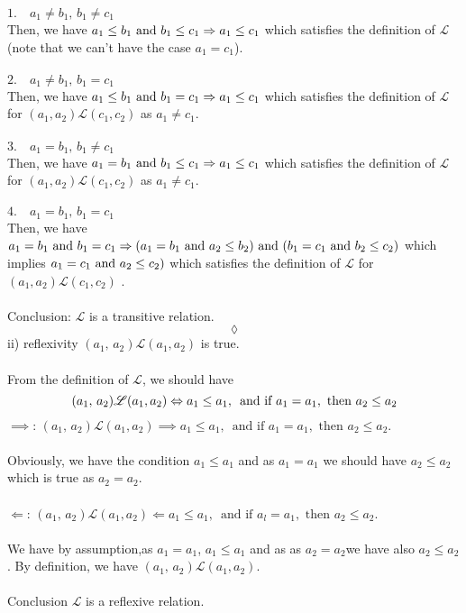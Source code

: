  $1.\quad a_1\neq b_1,\, b_1\neq c_1$\\
 Then, we have $a_1\leq b_1 \text{ and } b_1\leq c_1\Rightarrow a_1\leq c_1 $ which satisfies the definition of $\mathscr{L}$ (note that we can't have the case $a_1=c_1$).\\\\
  $2.\quad a_1\neq b_1,\, b_1= c_1$\\
  Then, we have $a_1\leq b_1 \text{ and } b_1 = c_1\Rightarrow a_1\leq c_1  $ which satisfies the definition of $\mathscr{L}$ for  $(a_1,a_2)\mathscr{L}(c_1, c_2)$ as $a_1\neq c_1$.\\\\
    $3.\quad a_1= b_1,\, b_1\neq c_1$\\
  Then, we have $a_1= b_1 \text{ and } b_1 \leq c_1\Rightarrow a_1\leq c_1  $ which satisfies the definition of $\mathscr{L}$ for  $(a_1,a_2)\mathscr{L}(c_1, c_2)$ as $a_1\neq c_1$.\\\\
      $4.\quad a_1= b_1,\, b_1=c_1$\\
  Then, we have $a_1= b_1 \text{ and } b_1 = c_1\Rightarrow (a_1= b_1 \text{ and } a_2\leq b_2) \text{ and }  (b_1= c_1 \text{ and } b_2\leq c_2) $ which implies  $a_1= c_1 \text{ and } a_2\leq c_2) $ which satisfies the definition of $\mathscr{L}$ for  $(a_1,a_2)\mathscr{L}(c_1, c_2)$ .\\\\
  Conclusion: $\mathscr{L}$ is a transitive relation.
$$\lozenge$$
ii) reflexivity  $(a_1,\, a_2)\mathscr{L} (a_1, a_2)$ is true.\\\\
 From the definition of $\mathscr{L}$, we should have  $$(a_1,\, a_2)\mathscr{L} (a_1, a_2)\Leftrightarrow a_1\leq a_1,\,\text{ and if } a_1 = a_1, \text{ then } a_2\leq a_2$$
 $\implies $: $(a_1,\, a_2)\mathscr{L} (a_1, a_2)\implies a_1\leq a_1,\,\text{ and if } a_1 = a_1, \text{ then } a_2\leq a_2$.\\\\
 Obviously, we have the condition $a_1\leq a_1$ and as $a_1= a_1$ we should have $a_2\leq a_2$ which is true as $a_2= a_2$.\\\\
  $\Leftarrow  $: $(a_1,\, a_2)\mathscr{L} (a_1, a_2)\Leftarrow a_1\leq a_1,\,\text{ and if } a_l = a_1, \text{ then } a_2\leq a_2$.\\\\
We have by assumption,as $a_1= a_1$,  $a_1\leq a_1$ and as as $a_2= a_2$we have also  $a_2\leq a_2$. By definition, we have $(a_1,\, a_2)\mathscr{L} (a_1, a_2)$.\\\\
Conclusion $\mathscr{L} $ is a reflexive relation.

